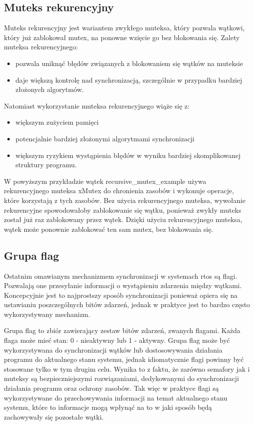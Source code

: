 \subsection{Muteks rekurencyjny}
Muteks rekurencyjny jest wariantem zwykłego muteksa, który pozwala wątkowi, który już zablokował mutex, na ponowne wzięcie go bez blokowania się.
Zalety muteksa rekurencyjnego\cite{freertosbook}:
\begin{itemize}
    \item pozwala uniknąć błędów związanych z blokowaniem się wątków na muteksie
    \item daje większą kontrolę nad synchronizacją, szczególnie w przypadku bardziej złożonych algorytmów.
\end{itemize}
Natomiast wykorzystanie muteksa rekurencyjnego wiąże się z:
\begin{itemize}
    \item większym zużyciem pamięci
    \item potencjalnie bardziej złożonymi algorytmami synchronizacji
    \item większym ryzykiem wystąpienia błędów w wyniku bardziej skomplikowanej struktury programu.
\end{itemize}



W powyższym przykładzie wątek recursive\_mutex\_example używa rekurencyjnego muteksa xMutex do chronienia zasobów i wykonuje operacje,
które korzystają z tych zasobów. Bez użycia rekurencyjnego muteksa, wywołanie rekurencyjne spowodowałoby zablokowanie się wątku,
ponieważ zwykły muteks został już raz zablokowany przez wątek. Dzięki użyciu rekurencyjnego muteksa, wątek może ponownie zablokować
ten sam mutex, bez blokowania się.
\subsection{Grupa flag}
Ostatnim omawianym mechanizmem synchronizacji w systemach \gls{rtos} są flagi.
Pozwalają one przesyłanie informacji o wystąpieniu zdarzenia między wątkami. Koncepcyjnie jest to najprostszy
sposób synchronizacji ponieważ opiera się na ustawianiu poszczególnych bitów zdarzeń, jednak w praktyce
jest to bardzo często wykorzystywany mechanizm.

Grupa flag to zbiór zawierający zestaw bitów zdarzeń, zwanych flagami. Każda flaga może mieć stan:
0 - nieaktywny lub 1 - aktywny\cite{freertosdocs}. Grupa flag może być wykorzystywana do synchronizacji wątków lub dostosowywania
działania programu do aktualnego stanu systemu, jednak idiomatycznie flagi powinny być stosowane tylko w tym drugim celu.
Wynika to z faktu, że zarówno semafory jak i muteksy są bezpieczniejszymi rozwiązaniami, dedykowanymi do synchronizacji
działania programu oraz ochrony zasobów. Tak więc w praktyce flagi są wykorzystywane do przechowywania informacji na
temat aktualnego stanu systemu, które to informacje mogą wpłynąć na to w jaki sposób będą zachowywały się pozostałe wątki.


